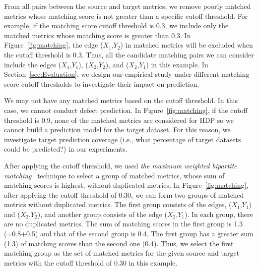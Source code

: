 From all pairs between the source and target metrics, we remove poorly matched
metrics whose matching score is not greater than a specific cutoff threshold.
For example, if the matching score cutoff threshold is 0.3, we include only the
matched metrics whose matching score is greater than 0.3. In
Figure~\ref{fig:matching}, the edge ($X_1$,$Y_2$) in matched metrics will be
excluded when the cutoff threshold is 0.3. Thus, all the candidate matching
pairs we can consider include the edges ($X_1$,$Y_1$), ($X_2$,$Y_2$), and
($X_2$,$Y_1$) in this example.
In Section~\ref{sec:Evaluation}, we design our empirical study under different
matching score cutoff thresholds to investigate their impact on prediction.

We may not have any matched metrics based on the cutoff threshold. In this
case, we cannot conduct defect prediction. In
Figure~\ref{fig:matching}, if the cutoff threshold is 0.9, none of the matched
metrics are considered for HDP so we cannot build a prediction model for the target
dataset. For this reason, we investigate target prediction coverage (i.e.,
what percentage of target datasets could be predicted?) in
our experiments.

After applying the cutoff threshold, we
used {\em the maximum weighted bipartite matching}~\cite{Matouek06} technique to
select a group of matched metrics, whose sum of matching scores is highest,
without duplicated metrics.
In Figure~\ref{fig:matching}, after applying the cutoff threshold of 0.30, we
can form two groups of matched metrics without duplicated metrics. The first
group consists of the edges, ($X_1$,$Y_1$) and ($X_2$,$Y_2$), and another group
consists of the edge ($X_2$,$Y_1$). In each group, there are no duplicated
metrics. The sum of matching scores in the first group is 1.3 (=0.8+0.5) and that of the second
group is 0.4.
The first group has a greater sum (1.3) of matching scores than the
second one (0.4). Thus, we select the first matching group as the set of
matched metrics for the given source and target metrics with the cutoff
threshold of 0.30 in this example.
 
% 


